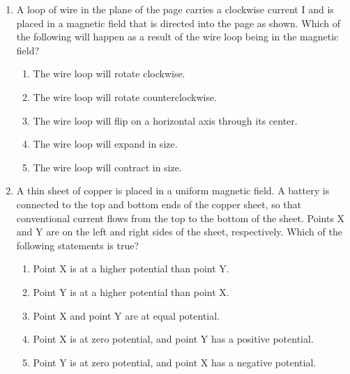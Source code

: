 \documentclass{../../../oss-apphys}
\begin{document}
\begin{multicols}{2}
\begin{enumerate}[leftmargin=18pt,resume]
  \item A loop of wire in the plane of the page carries a clockwise current I
    and is placed in a magnetic field that is directed into the page as shown.
    Which of the following will happen as a result of the wire loop being in
    the magnetic field?
    \begin{center}
    \end{center}
    \begin{enumerate}[noitemsep,topsep=0pt,leftmargin=18pt,label=(\Alph*)]
    \item The wire loop will rotate clockwise.
    \item The wire loop will rotate counterclockwise.
    \item The wire loop will flip on a horizontal axis through its center.
    \item The wire loop will expand in size.
    \item The wire loop will contract in size.
    \end{enumerate}
    \columnbreak
    
  \item A thin sheet of copper is placed in a uniform magnetic field. A battery
    is connected to the top and bottom ends of the copper sheet, so that
    conventional current flows from the top to the bottom of the sheet.
    Points X and Y are on the left and right sides of the sheet, respectively.
    Which of the following statements is true?
    \begin{center}
    \end{center}
    \begin{enumerate}[noitemsep,topsep=0pt,leftmargin=18pt,label=(\Alph*)]
    \item Point X is at a higher potential than point Y.
    \item Point Y is at a higher potential than point X.
    \item Point X and point Y are at equal potential.
    \item Point X is at zero potential, and point Y has a positive potential.
    \item Point Y is at zero potential, and point X has a negative potential.
    \end{enumerate}


\end{enumerate}
\end{multicols}
\end{document}
